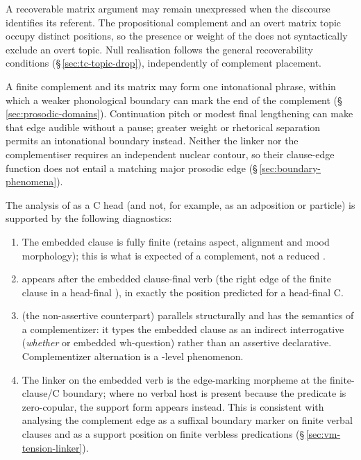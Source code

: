 \begin{center}
\end{center}

A recoverable matrix argument may remain unexpressed when the discourse
 identifies its referent. The propositional complement and an overt matrix
 topic occupy distinct positions, so the presence or weight of the
  does not syntactically exclude an overt topic. Null realisation
 follows the general recoverability conditions
 (§\,\ref{sec:tc-topic-drop}), independently of complement placement.


A finite complement and its matrix may form one intonational phrase, within
 which a weaker phonological boundary can mark the end of the complement
 (§\,\ref{sec:prosodic-domains}). Continuation pitch or modest final
 lengthening can make that edge audible without a pause; greater weight or
 rhetorical separation permits an intonational boundary instead. Neither the
 linker nor the complementiser requires an independent nuclear contour, so
 their clause-edge function does not entail a matching major prosodic edge
 (§\,\ref{sec:boundary-phenomena}).

The analysis of  as a C head (and not, for example, as an
adposition or particle) is supported by the following diagnostics:
\begin{enumerate}
\item The embedded clause is fully finite (retains aspect,
  alignment and mood morphology); this is what is
  expected of a  complement, not a reduced .
\item {} appears after the embedded clause-final verb
  (the right edge of the finite clause in a head-final ), in exactly the
  position predicted for a head-final C.
\item {} (the non-assertive counterpart) parallels 
  structurally and has the semantics of a complementizer: it
  types the embedded clause as an indirect interrogative
  (\textit{whether} or embedded wh-question) rather than an
  assertive declarative. Complementizer alternation is a
  -level phenomenon.
\item The linker  on the embedded verb is the edge-marking
  morpheme at the finite-clause/C boundary; where no verbal host is
  present because the predicate is zero-copular, the support form 
  appears instead. This is consistent with analysing the complement edge as a
  suffixal boundary marker on finite verbal clauses and as a support position
  on finite verbless predications (§\,\ref{sec:vm-tension-linker}).
\end{enumerate}

